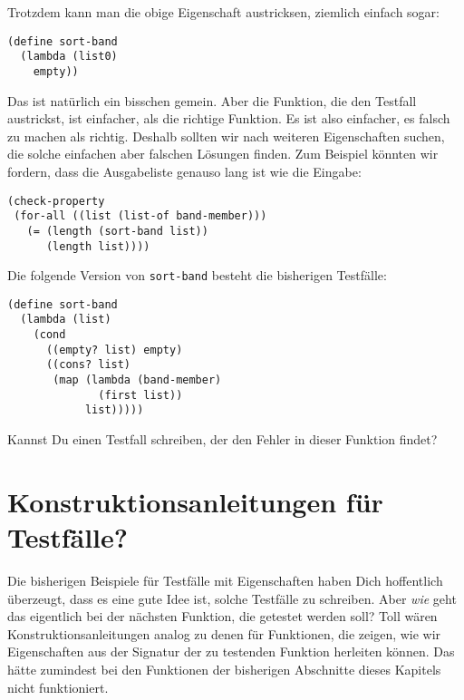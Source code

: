 Trotzdem kann man die obige Eigenschaft austricksen, ziemlich einfach
sogar:
%
\begin{lstlisting}
(define sort-band
  (lambda (list0)
    empty))
\end{lstlisting}
%
Das ist natürlich ein bisschen gemein.  Aber die Funktion, die den
Testfall austrickst, ist einfacher, als die richtige Funktion.  Es ist
also einfacher, es falsch zu machen als richtig.  Deshalb sollten wir
nach weiteren Eigenschaften suchen, die solche einfachen aber falschen
Lösungen finden.  Zum Beispiel könnten wir fordern, dass die
Ausgabeliste genauso lang ist wie die Eingabe:
%
\begin{lstlisting}
(check-property
 (for-all ((list (list-of band-member)))
   (= (length (sort-band list))
      (length list))))
\end{lstlisting}
%
\begin{aufgabeinline}
  Die folgende Version von \lstinline{sort-band} besteht die
  bisherigen Testfälle:
\begin{lstlisting}
(define sort-band
  (lambda (list)
    (cond
      ((empty? list) empty)
      ((cons? list)
       (map (lambda (band-member)
              (first list))
            list)))))
\end{lstlisting}
  Kannst Du einen Testfall schreiben, der den Fehler in dieser
  Funktion findet?
\end{aufgabeinline}


\section{Konstruktionsanleitungen für Testfälle?}
\label{sec:ka-testfaelle}

Die bisherigen Beispiele für Testfälle mit Eigenschaften haben Dich
hoffentlich überzeugt, dass es eine gute Idee ist, solche Testfälle zu
schreiben.  Aber \emph{wie} geht das eigentlich bei der nächsten
Funktion, die getestet werden soll?  Toll wären
Konstruktionsanleitungen analog zu denen für Funktionen, die zeigen,
wie wir Eigenschaften aus der Signatur der zu testenden Funktion
herleiten können.  Das hätte zumindest bei den Funktionen der
bisherigen Abschnitte dieses Kapitels nicht funktioniert.

